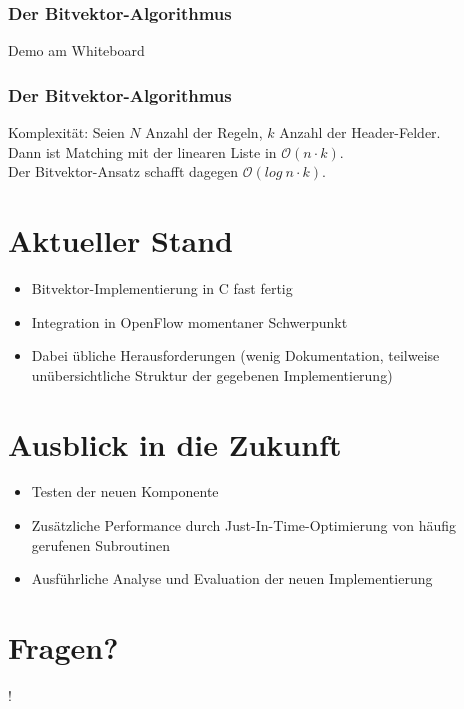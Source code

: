 \documentclass{beamer}
\begin{document}
\begin{frame}
\frametitle{Der Bitvektor-Algorithmus}
Demo am Whiteboard
\end{frame}

\begin{frame}
\frametitle{Der Bitvektor-Algorithmus}
Komplexität: Seien $N$ Anzahl der Regeln, $k$ Anzahl der Header-Felder.\\
Dann ist Matching mit der linearen Liste in $\mathcal O(n \cdot k)$.\\
Der Bitvektor-Ansatz schafft dagegen  $\mathcal O(log\ n \cdot k)$.
\end{frame}

\section{Aktueller Stand}
\begin{frame}
\begin{itemize}
    \item Bitvektor-Implementierung in C fast fertig
    \item Integration in OpenFlow momentaner Schwerpunkt 
    \item Dabei übliche Herausforderungen (wenig Dokumentation, teilweise unübersichtliche Struktur der gegebenen Implementierung)
\end{itemize}
\end{frame}

\section{Ausblick in die Zukunft}
\begin{frame}
\begin{itemize}
    \item Testen der neuen Komponente
    \item Zusätzliche Performance durch Just-In-Time-Optimierung von häufig gerufenen Subroutinen
    \item Ausführliche Analyse und Evaluation der neuen Implementierung
\end{itemize}
\end{frame}

\section*{Fragen?}
\begin{frame}
\begin{center}
\huge{!}
\end{center}
\end{frame}
\end{document}
